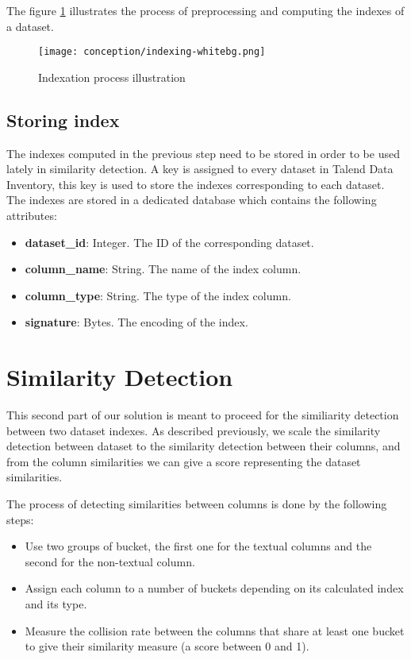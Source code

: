 The figure \ref{fig:indexation_process} illustrates the process of preprocessing
and computing the indexes of a dataset.

\begin{figure}[h]
    \centering
    \texttt{[image: conception/indexing-whitebg.png]}
    \caption{Indexation process illustration}
    \label{fig:indexation_process}
\end{figure}

\subsection{Storing index}
The indexes computed in the previous step need to be stored in order to be used
lately in similarity detection. A key is assigned to every dataset in Talend
Data Inventory, this key is used to store the indexes corresponding to each
dataset. The indexes are stored in a dedicated database which contains the
following attributes:

\begin{itemize}
    \item \textbf{dataset\_id}: Integer. The ID of the corresponding dataset.
    \item \textbf{column\_name}: String. The name of the index column.
    \item \textbf{column\_type}: String. The type of the index column.
    \item \textbf{signature}: Bytes. The encoding of the index.
\end{itemize}


\section{Similarity Detection}
This second part of our solution is meant to proceed for the similiarity
detection between two dataset indexes. As described previously, we scale the
similarity detection between dataset to the similarity detection between their
columns, and from the column similarities we can give a score representing the
dataset similarities. 

The process of detecting similarities between columns is
done by the following steps:

\begin{itemize}
    \item Use two groups of bucket, the first one for the textual columns and
    the second for the non-textual column.
    \item Assign each column to a number of buckets depending on its
     calculated index and its type.
    \item Measure the collision rate between the columns that share at least one
    bucket to give their similarity measure (a score between 0 and 1).
\end{itemize}

